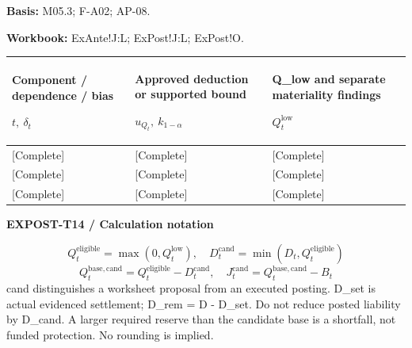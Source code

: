 \textbf{Basis:} M05.3; F-A02; AP-08.\par
\textbf{Workbook:} ExAnte!J:L; ExPost!J:L; ExPost!O.\par\endgroup
{\sffamily\fontsize{8.3}{10.3}\selectfont\begin{longtable}{@{}P{54.83mm} P{54.83mm} P{54.83mm}@{}}
\toprule
\textbf{Component / dependence / bias}\par {\normalfont\fontsize{8.2}{10}\selectfont $t,\ \delta_t$} & \textbf{Approved deduction or supported bound}\par {\normalfont\fontsize{8.2}{10}\selectfont $u_{Q_t},\ k_{1-\alpha}$} & \textbf{Q\_low and separate materiality findings}\par {\normalfont\fontsize{8.2}{10}\selectfont $Q_t^{\mathrm{low}}$}\\\midrule\endhead
\rule{0pt}{8mm}[Complete] & [Complete] & [Complete]\\\hline
\rule{0pt}{8mm}[Complete] & [Complete] & [Complete]\\\hline
\rule{0pt}{8mm}[Complete] & [Complete] & [Complete]\\\hline
\end{longtable}}
\par\begingroup\sffamily\fontsize{8}{10}\selectfont\color{NEBGreen}\setlength{\parskip}{2pt}\setlength{\abovedisplayskip}{4pt}\setlength{\belowdisplayskip}{4pt}\setlength{\abovedisplayshortskip}{2pt}\setlength{\belowdisplayshortskip}{3pt}
\textbf{EXPOST-T14 / Calculation notation}\par
{\fontsize{9}{11}\selectfont\[ Q_t^{\mathrm{eligible}}=\max(0,Q_t^{\mathrm{low}}),\quad D_t^{\mathrm{cand}}=\min(D_t,Q_t^{\mathrm{eligible}}) \]}
{\fontsize{9}{11}\selectfont\[ Q_t^{\mathrm{base,cand}}=Q_t^{\mathrm{eligible}}-D_t^{\mathrm{cand}},\quad J_t^{\mathrm{cand}}=Q_t^{\mathrm{base,cand}}-B_t \]}
cand distinguishes a worksheet proposal from an executed posting. D\_set is actual evidenced settlement; D\_rem = D - D\_set. Do not reduce posted liability by D\_cand. A larger required reserve than the candidate base is a shortfall, not funded protection. No rounding is implied.\par
